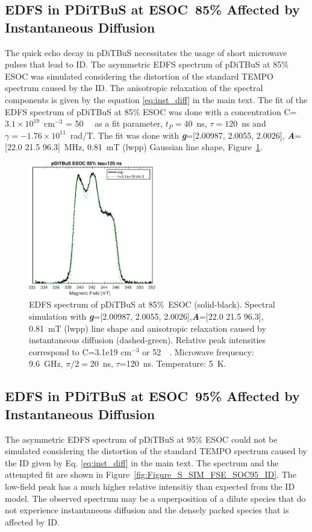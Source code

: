 \newpage
\subsection{EDFS in PDiTBuS at ESOC~85\% Affected by Instantaneous Diffusion}
The quick echo decay in pDiTBuS necessitates the usage of short microwave pulses that lead to ID. The asymmetric EDFS spectrum of pDiTBuS at 85\% ESOC was simulated considering the distortion of the standard TEMPO spectrum caused by the ID. The anisotropic relaxation of the spectral components is given by the equation \ref{eq:inst_diff} in the main text. The fit of the EDFS spectrum of pDiTBuS at 85\% ESOC was done with a concentration C=$3.1\times10^{19}$~cm$^{-3}$ = 50~\si{\milli\Molar} as a fit parameter, $t_P=40$~ns, $\tau=120$~ns and $\gamma=-1.76\times10^{11}$~rad/T. The fit was done with \textit{\textbf{g}}=[2.00987, 2.0055, 2.0026], \textit{\textbf{A}}=[22.0 21.5 96.3]~MHz, 0.81~mT (lwpp) Gaussian line shape, Figure~\ref{fig:Figure_S23}.

\begin{figure}[ht!]
  \centering
	\includegraphics[width=0.5\textwidth]{./pulse/figures/Figure_S23.pdf}
	\caption{EDFS spectrum of pDiTBuS at 85\%~ESOC (solid-black). Spectral simulation with \textit{\textbf{g}}=[2.00987, 2.0055, 2.0026],\textit{\textbf{A}}=[22.0 21.5 96.3], 0.81~mT (lwpp)  line shape and anisotropic relaxation caused by instantaneous diffusion (dashed-green). Relative peak intensities correspond to C=3.1e19 cm$^{-3}$ or 52~\si{\milli\Molar}. Microwave frequency: 9.6~GHz, $\pi/2=20$~ns, $\tau$=120~ns. Temperature: 5~K.}
	\label{fig:Figure_S23}
\end{figure}


\newpage


\subsection{EDFS in PDiTBuS at ESOC~95\% Affected by Instantaneous Diffusion}
\label{esi:fse_sims_ID_full}
The asymmetric EDFS spectrum of pDiTBuS at 95\% ESOC could not be simulated considering the distortion of the standard TEMPO spectrum caused by the ID given by Eq. \ref{eq:inst_diff} in the main text. The spectrum and the attempted fit are shown in Figure~\ref{fig:Figure_S_SIM_FSE_SOC95_ID}. The low-field peak has a much higher relative intensitiy than expected from the ID model. The observed spectrum may be a superposition of a dilute species that do not experience instantaneous diffusion and the densely packed species that is affected by ID.\\

